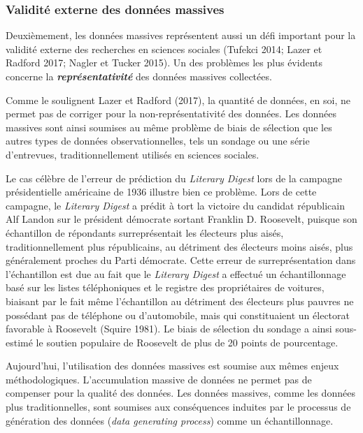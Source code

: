 \documentclass[
  letterpaper,
  DIV=11,
  numbers=noendperiod]{scrreprt}
\begin{document}
\hypertarget{validituxe9-externe-des-donnuxe9es-massives}{%
\subsubsection*{Validité externe des données
massives}\label{validituxe9-externe-des-donnuxe9es-massives}}

Deuxièmement, les données massives représentent aussi un défi important
pour la validité externe des recherches en sciences sociales (Tufekci
2014; Lazer et Radford 2017; Nagler et Tucker 2015). Un des problèmes
les plus évidents concerne la \textbf{\emph{représentativité}} des
données massives collectées.

Comme le soulignent Lazer et Radford (2017), la quantité de données, en
soi, ne permet pas de corriger pour la non-représentativité des données.
Les données massives sont ainsi soumises au même problème de biais de
sélection que les autres types de données observationnelles, tels un
sondage ou une série d'entrevues, traditionnellement utilisés en
sciences sociales.

Le cas célèbre de l'erreur de prédiction du \emph{Literary Digest} lors
de la campagne présidentielle américaine de 1936 illustre bien ce
problème. Lors de cette campagne, le \emph{Literary Digest} a prédit à
tort la victoire du candidat républicain Alf Landon sur le président
démocrate sortant Franklin D. Roosevelt, puisque son échantillon de
répondants surreprésentait les électeurs plus aisés, traditionnellement
plus républicains, au détriment des électeurs moins aisés, plus
généralement proches du Parti démocrate. Cette erreur de
surreprésentation dans l'échantillon est due au fait que le
\emph{Literary Digest} a effectué un échantillonnage basé sur les listes
téléphoniques et le registre des propriétaires de voitures, biaisant par
le fait même l'échantillon au détriment des électeurs plus pauvres ne
possédant pas de téléphone ou d'automobile, mais qui constituaient un
électorat favorable à Roosevelt (Squire 1981). Le biais de sélection du
sondage a ainsi sous-estimé le soutien populaire de Roosevelt de plus de
20 points de pourcentage.

Aujourd'hui, l'utilisation des données massives est soumise aux mêmes
enjeux méthodologiques. L'accumulation massive de données ne permet pas
de compenser pour la qualité des données. Les données massives, comme
les données plus traditionnelles, sont soumises aux conséquences
induites par le processus de génération des données (\emph{data
generating process}) comme un échantillonnage.
\end{document}
